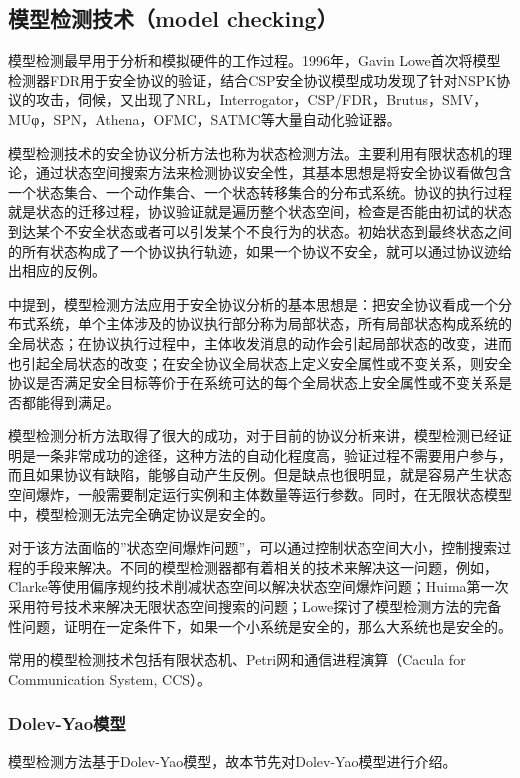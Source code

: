 \documentclass[cs4size,a4pape,UTF8]{ctexart}
\numberwithin{equation}{section}
\numberwithin{table}{section}
\numberwithin{figure}{section}
\begin{document}
\subsection{模型检测技术（model checking）}

模型检测最早用于分析和模拟硬件的工作过程。1996年，Gavin Lowe首次将模型检测器FDR用于安全协议的验证，结合CSP安全协议模型成功发现了针对NSPK协议的攻击，伺候，又出现了NRL，Interrogator，CSP/FDR，Brutus，SMV，MUφ，SPN，Athena，OFMC，SATMC等大量自动化验证器\cite{1}\cite{6}。

模型检测技术的安全协议分析方法也称为状态检测方法。主要利用有限状态机的理论，通过状态空间搜索方法来检测协议安全性，其基本思想是将安全协议看做包含一个状态集合、一个动作集合、一个状态转移集合的分布式系统。协议的执行过程就是状态的迁移过程，协议验证就是遍历整个状态空间，检查是否能由初试的状态到达某个不安全状态或者可以引发某个不良行为的状态。初始状态到最终状态之间的所有状态构成了一个协议执行轨迹，如果一个协议不安全，就可以通过协议迹给出相应的反例\cite{2}\cite{6}。

\cite{book}中提到，模型检测方法应用于安全协议分析的基本思想是：把安全协议看成一个分布式系统，单个主体涉及的协议执行部分称为局部状态，所有局部状态构成系统的全局状态；在协议执行过程中，主体收发消息的动作会引起局部状态的改变，进而也引起全局状态的改变；在安全协议全局状态上定义安全属性或不变关系，则安全协议是否满足安全目标等价于在系统可达的每个全局状态上安全属性或不变关系是否都能得到满足。

模型检测分析方法取得了很大的成功，对于目前的协议分析来讲，模型检测已经证明是一条非常成功的途径，这种方法的自动化程度高，验证过程不需要用户参与，而且如果协议有缺陷，能够自动产生反例。但是缺点也很明显，就是容易产生状态空间爆炸，一般需要制定运行实例和主体数量等运行参数。同时，在无限状态模型中，模型检测无法完全确定协议是安全的\cite{1}。

对于该方法面临的''状态空间爆炸问题''，可以通过控制状态空间大小，控制搜索过程的手段来解决。不同的模型检测器都有着相关的技术来解决这一问题，例如，Clarke等使用偏序规约技术削减状态空间以解决状态空间爆炸问题；Huima第一次采用符号技术来解决无限状态空间搜索的问题；Lowe探讨了模型检测方法的完备性问题，证明在一定条件下，如果一个小系统是安全的，那么大系统也是安全的。

常用的模型检测技术包括有限状态机、Petri网和通信进程演算（Cacula for Communication System, CCS）。

\subsubsection{Dolev-Yao模型}
模型检测方法基于Dolev-Yao模型，故本节先对Dolev-Yao模型进行介绍。
\end{document}
